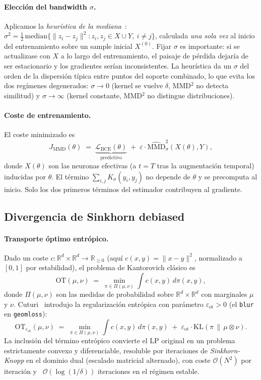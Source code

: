 \documentclass[11pt, a4paper]{article}
\theoremstyle{definition}
\newcommand{\R}{\mathbb{R}}
\newcommand{\eps}{\varepsilon}
\begin{document}
\paragraph{Elección del bandwidth $\sigma$.} Aplicamos la
\emph{heurística de la mediana}~\cite{Gretton2012}:
$\sigma^2 = \tfrac{1}{2}\,\mathrm{median}\bigl\{\|z_i - z_j\|^2 :
z_i, z_j \in X \cup Y,\ i\neq j\bigr\}$, calculada \emph{una sola vez}
al inicio del entrenamiento sobre un sample inicial $X^{(0)}$. Fijar
$\sigma$ es importante: si se actualizase con $X$ a lo largo del
entrenamiento, el paisaje de pérdida dejaría de ser estacionario y
los gradientes serían inconsistentes. La heurística da un
$\sigma$ del orden de la dispersión típica entre puntos del soporte
combinado, lo que evita los dos regímenes degenerados:
$\sigma\to 0$ (kernel se vuelve $\delta$, MMD$^2$ no detecta
similitud) y $\sigma\to\infty$ (kernel constante, MMD$^2$ no
distingue distribuciones).

\paragraph{Coste de entrenamiento.} El coste minimizado es
\[
  J_{\mathrm{MMD}}(\theta) \;=\;
  \underbrace{\mathcal L_{\mathrm{BCE}}(\theta)}_{\text{predictivo}}
  \;+\; \eps\cdot \widehat{\mathrm{MMD}}^2_\sigma(X(\theta), Y),
\]
donde $X(\theta)$ son las neuronas efectivas (a $t=T$ tras la
augmentación temporal) inducidas por $\theta$. El término
$\sum_{i,j}\! K_\sigma(y_i, y_j)$ no depende de $\theta$ y se
precomputa al inicio. Solo los dos primeros términos del estimador
contribuyen al gradiente.

\subsection{Divergencia de Sinkhorn debiased}
\label{sec:reg-moons-sinkhorn}

\paragraph{Transporte óptimo entrópico.} Dado un coste
$c: \R^d\times\R^d\to\R_{\geq 0}$ (aquí $c(x,y)=\|x-y\|^2$,
normalizado a $[0,1]$ por estabilidad), el problema de Kantorovich
clásico es
\[
  \mathrm{OT}(\mu,\nu) \;=\; \min_{\pi\in\Pi(\mu,\nu)}
  \int c(x,y)\,d\pi(x,y),
\]
donde $\Pi(\mu,\nu)$ son las medidas de probabilidad sobre
$\R^d\times\R^d$ con marginales $\mu$ y $\nu$.
Cuturi~\cite{Cuturi2013} introdujo la regularización entrópica con
parámetro $\eps_{\mathrm{ot}}>0$ (el \texttt{blur} en
\texttt{geomloss}):
\[
  \mathrm{OT}_{\eps_{\mathrm{ot}}}(\mu,\nu)
  \;=\; \min_{\pi\in\Pi(\mu,\nu)}
  \int c(x,y)\,d\pi(x,y)
  \;+\; \eps_{\mathrm{ot}}\cdot \mathrm{KL}(\pi\,\|\,\mu\otimes\nu).
\]
La inclusión del término entrópico convierte el LP original en un
problema estrictamente convexo y diferenciable, resoluble por
iteraciones de \emph{Sinkhorn-Knopp} en el dominio dual (escalado
matricial alternado), con coste $\mathcal O(N^2)$ por iteración y
~$\mathcal O(\log(1/\delta))$ iteraciones en el régimen estable.
\end{document}
